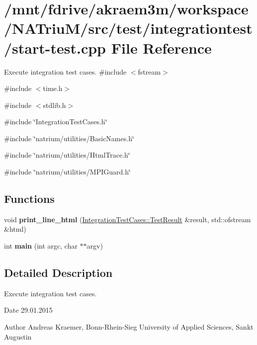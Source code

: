 \hypertarget{start-test_8cpp}{
\section{/mnt/fdrive/akraem3m/workspace/NATriuM/src/test/integrationtest/start-\/test.cpp File Reference}
\label{start-test_8cpp}
}


Execute integration test cases.  
{\ttfamily \#include $<$fstream$>$}\par
{\ttfamily \#include $<$time.h$>$}\par
{\ttfamily \#include $<$stdlib.h$>$}\par
{\ttfamily \#include \char`\"{}IntegrationTestCases.h\char`\"{}}\par
{\ttfamily \#include \char`\"{}natrium/utilities/BasicNames.h\char`\"{}}\par
{\ttfamily \#include \char`\"{}natrium/utilities/HtmlTrace.h\char`\"{}}\par
{\ttfamily \#include \char`\"{}natrium/utilities/MPIGuard.h\char`\"{}}\par
\subsection*{Functions}
\begin{DoxyCompactItemize}
\item 
\hypertarget{start-test_8cpp_a363deb579434784ee372fb2d37def478}{
void {\bfseries print\_\-line\_\-html} (\hyperlink{structIntegrationTestCases_1_1TestResult}{IntegrationTestCases::TestResult} \&result, std::ofstream \&html)}
\label{start-test_8cpp_a363deb579434784ee372fb2d37def478}

\item 
\hypertarget{start-test_8cpp_a3c04138a5bfe5d72780bb7e82a18e627}{
int {\bfseries main} (int argc, char $\ast$$\ast$argv)}
\label{start-test_8cpp_a3c04138a5bfe5d72780bb7e82a18e627}

\end{DoxyCompactItemize}


\subsection{Detailed Description}
Execute integration test cases. \begin{DoxyDate}{Date}
29.01.2015 
\end{DoxyDate}
\begin{DoxyAuthor}{Author}
Andreas Kraemer, Bonn-\/Rhein-\/Sieg University of Applied Sciences, Sankt Augustin 
\end{DoxyAuthor}
